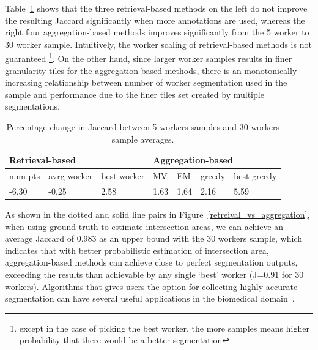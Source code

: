     \par Table~\ref{workerScaling} shows that the three retrieval-based methods on the left do not improve the resulting Jaccard significantly when more annotations are used, whereas the right four aggregation-based methods improves significantly from the 5 worker to 30 worker sample. Intuitively, the worker scaling of retrieval-based methods is not guaranteed \footnote{except in the case of picking the best worker, the more samples means higher probability that there would be a better segmentation}. On the other hand, since larger worker samples results in finer granularity tiles for the aggregation-based methods, there is an monotonically increasing relationship between number of worker segmentation used in the sample and performance due to the finer tiles set created by multiple segmentations.
      \begin{table}
      \small
        \setlength\tabcolsep{1.5pt}
        \begin{tabular}{l|l|l|llll}
\multicolumn{3}{l|}{Retrieval-based} & \multicolumn{4}{l}{Aggregation-based}                                                             \\ \hline
num pts  & avrg worker & best worker & \multicolumn{1}{l|}{MV}   & \multicolumn{1}{l|}{EM}   & \multicolumn{1}{l|}{greedy} & best greedy \\ \hline
-6.30    & -0.25       & 2.58        & \multicolumn{1}{l|}{1.63} & \multicolumn{1}{l|}{1.64} & \multicolumn{1}{l|}{2.16}   & 5.59       
\end{tabular}
        \caption{Percentage change in Jaccard between 5 workers samples and 30 workers sample averages.}
        \label{workerScaling}
        \vspace{-10pt}
      \end{table}
       \par As shown in the dotted and solid line pairs in Figure~\ref{retreival_vs_aggregation}, when using ground truth to estimate intersection areas, we can achieve an average Jaccard of 0.983 as an upper bound with the 30 workers sample, which indicates that with better probabilistic estimation of intersection area, aggregation-based methods can achieve close to perfect segmentation outputs, exceeding the results than achievable by any single `best' worker (J=0.91 for 30 workers). Algorithms that gives users the option for collecting highly-accurate segmentation can have several useful applications in the biomedical domain~\cite{Gurari2015}.